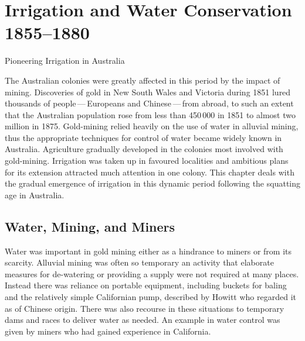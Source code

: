 
\setcounter{endnote}{0}

\chapter{Irrigation and Water Conservation 1855--1880}
\label{ch:emergence}
%
{Pioneering Irrigation in Australia}

The Australian colonies were greatly affected in this period by the
impact of mining. Discoveries of gold in New South Wales and Victoria
during 1851 lured thousands of people\,---\,Europeans and
Chinese\,---\,from abroad, to such an extent that the Australian
population rose from less than 450\,000 in 1851 to almost two million
in 1875.  Gold-mining relied heavily on the use of water in alluvial
mining, thus the appropriate techniques for control of water became
widely known in Australia.  Agriculture gradually developed in the
colonies most involved with gold-mining.  Irrigation was taken up in
favoured localities and ambitious plans for its extension attracted
much attention in one colony.  This chapter deals with the gradual
emergence of irrigation in this dynamic period following the squatting
age in Australia.

\section*{Water, Mining, and Miners}  

Water was important in gold mining either as a hindrance to miners or
from its scarcity.  Alluvial  mining was often so
temporary an activity that elaborate measures for de-watering or
providing a supply were not required at many places.  Instead there
was reliance on portable equipment, including buckets for baling and
the relatively simple Californian pump, described by Howitt who
regarded it as of Chinese origin.  There was also recourse in these
situations to temporary dams and races to deliver water as needed.  An
example in water control was given by miners who had gained experience
in California.

